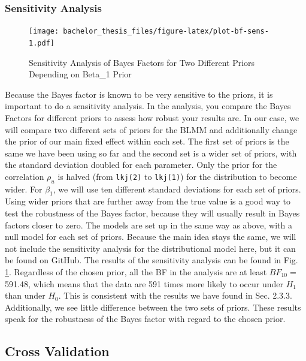 \documentclass[
  doc,12pt,floatsintext]{apa7}
\begin{document}
\subsubsection{Sensitivity Analysis}\label{sensitivity-analysis}



\begin{figure}
\centering
\texttt{[image: bachelor\_thesis\_files/figure-latex/plot-bf-sens-1.pdf]}
\caption{\label{fig:plot-bf-sens}Sensitivity Analysis of Bayes Factors for Two Different Priors Depending on Beta\_1 Prior}
\end{figure}

Because the Bayes factor is known to be very sensitive to the priors, it is important to do a sensitivity analysis. In the analysis, you compare the Bayes Factors for different priors to assess how robust your results are. In our case, we will compare two different sets of priors for the BLMM and additionally change the prior of our main fixed effect within each set. The first set of priors is the same we have been using so far and the second set is a wider set of priors, with the standard deviation doubled for each parameter. Only the prior for the correlation \(\rho_u\) is halved (from \texttt{lkj(2)} to \texttt{lkj(1)}) for the distribution to become wider. For \(\beta_1\), we will use ten different standard deviations for each set of priors. Using wider priors that are further away from the true value is a good way to test the robustness of the Bayes factor, because they will usually result in Bayes factors closer to zero. The models are set up in the same way as above, with a null model for each set of priors. Because the main idea stays the same, we will not include the sensitivity analysis for the distributional model here, but it can be found on GitHub. The results of the sensitivity analysis can be found in Fig. \ref{fig:plot-bf-sens}. Regardless of the chosen prior, all the BF in the analysis are at least \(BF_{10} =\) 591.48, which means that the data are 591 times more likely to occur under \(H_1\) than under \(H_0\). This is consistent with the results we have found in Sec. 2.3.3. Additionally, we see little difference between the two sets of priors. These results speak for the robustness of the Bayes factor with regard to the chosen prior.

\subsection{Cross Validation}\label{cross-validation}
\end{document}
